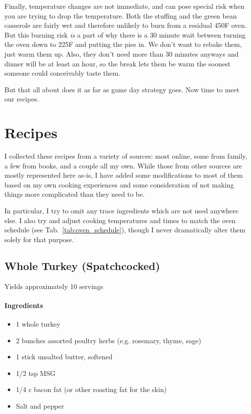 \documentclass[12pt]{article}
\newenvironment*{ingredients}
	{
		\paragraph*{Ingredients}
		\begin{itemize}
	}
	{
		\end{itemize}
	}
\begin{document}
	Finally, temperature changes are not immediate, and can pose special risk when you are trying to drop the temperature. Both the stuffing and the green bean casserole are fairly wet and therefore unlikely to burn from a residual 450F oven. But this burning risk \textit{is} a part of why there is a 30 minute wait between turning the oven down to 225F and putting the pies in. We don't want to rebake them, just warm them up. Also, they don't need more than 30 minutes anyways and dinner will be at least an hour, so the break lets them be warm the soonest someone could conceivably taste them.
	
	But that all about does it as far as game day strategy goes. Now time to meet our recipes.
	
	\newpage
	
	\section{Recipes}
	I collected these recipes from a variety of sources: most online, some from family, a few from books, and a couple all my own. While those from other sources are mostly represented here as-is, I have added some modifications to most of them based on my own cooking experiences and some consideration of not making things more complicated than they need to be.
	
	In particular, I try to omit any trace ingredients which are not used anywhere else. I also try and adjust cooking temperatures and times to match the oven schedule (see Tab.~\ref{tab:oven_schedule}), though I never dramatically alter them solely for that purpose.
	
	\newpage
	
	\subsection{Whole Turkey (Spatchcocked)}
	Yields approximately 10 servings
	
	\begin{ingredients}
		\item 1 whole turkey
		\item 2 bunches assorted poultry herbs (e.g. rosemary, thyme, sage)
		\item 1 stick unsalted butter, softened
		\item 1/2 tsp MSG
		\item 1/4 c bacon fat (or other roasting fat for the skin)
		\item Salt and pepper
	\end{ingredients}
	
\end{document}
